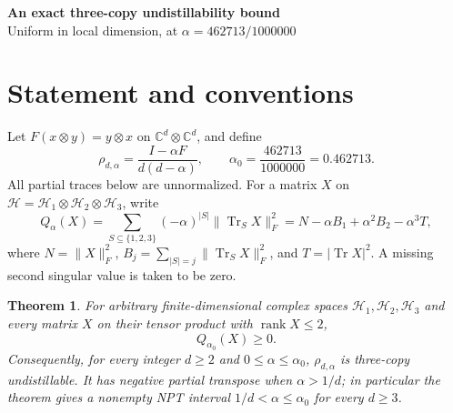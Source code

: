 \documentclass[10pt]{article}
\newtheorem{theorem}{Theorem}
\DeclareMathOperator{\Tr}{Tr}
\DeclareMathOperator{\rank}{rank}
\newcommand{\HH}{\mathcal H}
\newcommand{\CC}{\mathbb C}
\newcommand{\al}{\alpha_0}
\begin{document}
\begin{center}
{\Large\bfseries An exact three-copy undistillability bound}\\[3pt]
{\large Uniform in local dimension, at $\alpha=462713/1000000$}
\end{center}
\begin{abstract}
We give an exact-arithmetic, computer-assisted proof that Werner states with
parameter $0\le\alpha\le0.462713$ are three-copy undistillable in every
finite local dimension. The proof combines a dimension-independent quadratic
inequality for arbitrary complex rank-two matrices with a rational
four-replica certificate. Positivity of 238 strictly positive leading blocks
implies positivity in all sufficiently large dimensions; isometric embedding
then covers every finite dimension. The analytic inequality is proved here.
The accompanying rational data and independent checker comprise the finite
computational part of the proof.
\end{abstract}

\section{Statement and conventions}
Let $F(x\otimes y)=y\otimes x$ on $\CC^d\otimes\CC^d$, and define
\begin{equation}\label{eq:werner}
 \rho_{d,\alpha}=\frac{I-\alpha F}{d(d-\alpha)},\qquad
 \al=\frac{462713}{1000000}=0.462713.
\end{equation}
All partial traces below are unnormalized. For a matrix $X$ on
$\HH=\HH_1\otimes\HH_2\otimes\HH_3$, write
\begin{equation}\label{eq:Q}
 Q_\alpha(X)=\sum_{S\subseteq\{1,2,3\}}(-\alpha)^{|S|}
                      \|\Tr_S X\|_F^2
 =N-\alpha B_1+\alpha^2B_2-\alpha^3T,
\end{equation}
where $N=\|X\|_F^2$, $B_j=\sum_{|S|=j}\|\Tr_S X\|_F^2$,
and $T=|\Tr X|^2$. A missing second singular value is taken to be zero.

\begin{theorem}\label{thm:main}
For arbitrary finite-dimensional complex spaces $\HH_1,\HH_2,\HH_3$ and
every matrix $X$ on their tensor product with $\rank X\le2$,
\[
 Q_{\al}(X)\ge0.
\]
Consequently, for every integer $d\ge2$ and $0\le\alpha\le\al$,
$\rho_{d,\alpha}$ is three-copy undistillable. It has negative partial
transpose when $\alpha>1/d$; in particular the theorem gives a nonempty NPT
interval $1/d<\alpha\le\al$ for every $d\ge3$.
\end{theorem}
\end{document}
